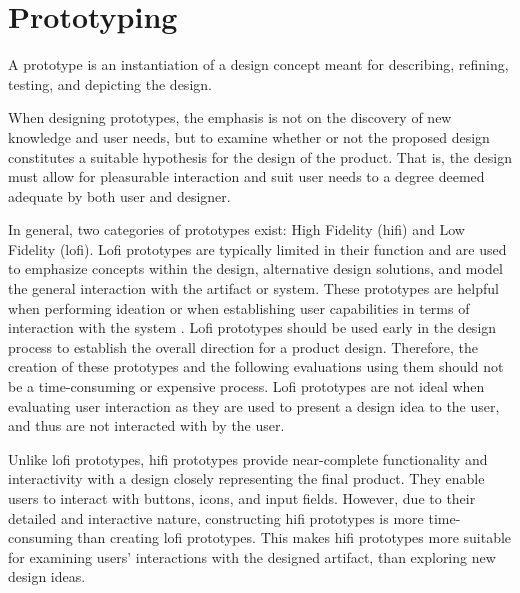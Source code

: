 \section{Prototyping} %
A prototype is an instantiation of a design concept meant for describing, refining, testing, and depicting the design.\cite{BUXTON2007139_prototyping}

When designing prototypes, the emphasis is not on the discovery of new knowledge and user needs, but to examine whether or not the proposed design constitutes a suitable hypothesis for the design of the product\cite{nielsen-norman-prototype-low-vs-high,BUXTON2007139_prototyping}.
That is, the design must allow for pleasurable interaction and suit user needs to a degree deemed adequate by both user and designer.

In general, two categories of prototypes exist: High Fidelity (hifi) and Low Fidelity (lofi).
Lofi prototypes are typically limited in their function and are used to emphasize concepts within the design, alternative design solutions, and model the general interaction with the artifact or system\cite{low-vs-high-fidelity-prototype}.
These prototypes are helpful when performing ideation\cite{nielsen-norman-ideation} or when establishing user capabilities in terms of interaction with the system \cite{usefullness-of-different-prototypes,low-vs-high-fidelity-prototype}.
Lofi prototypes should be used early in the design process to establish the overall direction for a product design. 
Therefore, the creation of these prototypes and the following evaluations using them should not be a time-consuming or expensive process. \cite{usefullness-of-different-prototypes,low-vs-high-fidelity-prototype} 
Lofi prototypes are not ideal when evaluating user interaction as they are used to present a design idea to the user, and thus are not interacted with by the user\cite{low-vs-high-fidelity-prototype}.

Unlike lofi prototypes, hifi prototypes provide near-complete functionality and interactivity with a design closely representing the final product.
They enable users to interact with buttons, icons, and input fields.
However, due to their detailed and interactive nature, constructing hifi prototypes is more time-consuming than creating lofi prototypes. 
This makes hifi prototypes more suitable for examining users' interactions with the designed artifact, than exploring new design ideas. \cite{nielsen-norman-prototype-low-vs-high,low-vs-high-fidelity-prototype}

